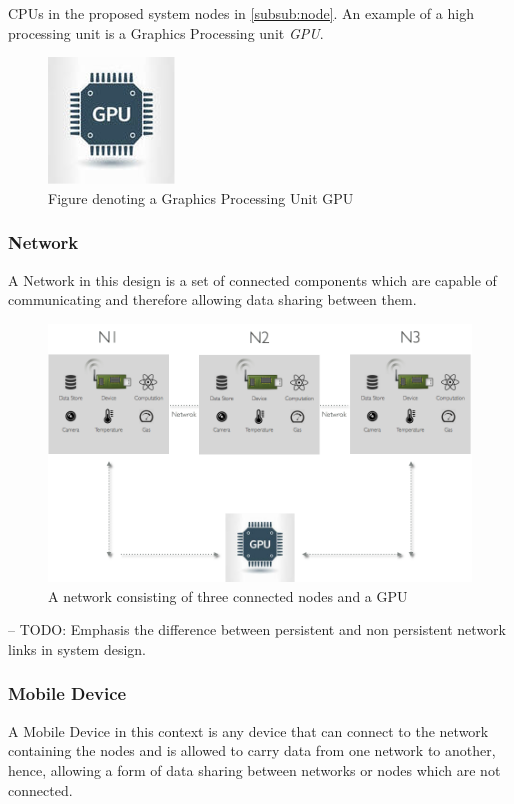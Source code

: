 CPUs in the proposed system nodes in \ref{subsub:node}. An example of a high processing unit is  a Graphics Processing unit \textit{GPU}.

\begin{figure}[H]
	\centering
	\includegraphics[scale=0.7]{images/gpu.png}
		\caption{Figure denoting a Graphics Processing Unit GPU}
	\label{fig:gpu}
\end{figure}

\subsubsection{Network}
\label{subsub:network}
A Network in this design is a set of connected components which are capable of communicating and therefore allowing data sharing between them.
\begin{figure}[H]
	\centering
	\includegraphics[scale=0.4]{images/network.png}
	\caption{A network consisting of three connected nodes and a GPU}
	\label{fig:network}
\end{figure}
-- TODO: 
Emphasis the difference between persistent and non persistent network links in system design.

\subsubsection{Mobile Device}
A Mobile Device in this context is any device that can connect to the network containing the nodes and is allowed to  carry data from one network to another, hence, allowing a form of data sharing between networks or nodes which are not connected.

